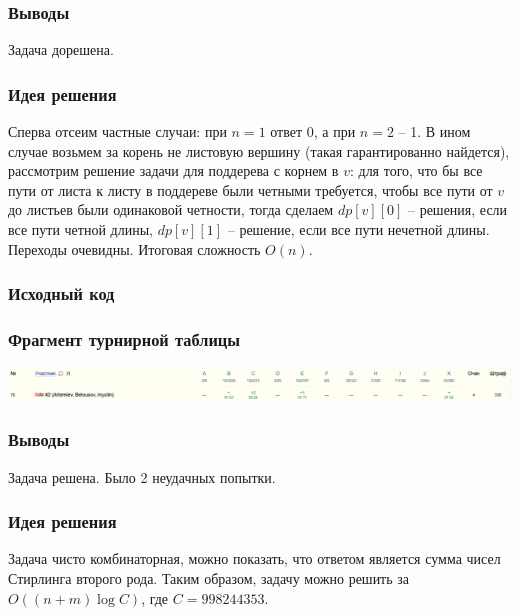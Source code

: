 \subsubsection*{Выводы}
Задача дорешена.
\pagebreak


\subsubsection*{Идея решения}
Сперва отсеим частные случаи: при $n = 1$ ответ $0$, а при $n = 2$ -- 1. В ином случае возьмем за корень не листовую вершину (такая гарантированно найдется), рассмотрим решение задачи для поддерева с корнем в $v$: для того, что бы все пути от листа к листу в поддереве были четными требуется, чтобы все пути от $v$ до листьев были одинаковой четности, тогда сделаем $dp[v][0]$ -- решения, если все пути четной длины, $dp[v][1]$ -- решение, если все пути нечетной длины. Переходы очевидны. Итоговая сложность $O(n)$.
\subsubsection*{Исходный код}

\subsubsection*{Фрагмент турнирной таблицы}
\includegraphics[width=\textwidth]{images/220206.png}\newline\noindent
\subsubsection*{Выводы}
Задача решена. Было 2 неудачных попытки.
\pagebreak


\subsubsection*{Идея решения}
Задача чисто комбинаторная, можно показать, что ответом является сумма чисел Стирлинга второго рода. Таким образом, задачу можно решить за $O((n + m)\log{C})$, где $C = 998244353$.
